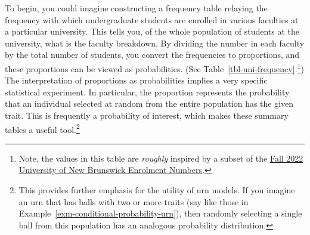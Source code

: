 \documentclass[
  letterpaper,
  DIV=11,
  numbers=noendperiod]{scrreprt}
\theoremstyle{definition}
\theoremstyle{definition}
\theoremstyle{definition}
\theoremstyle{remark}
\begin{document}
To begin, you could imagine constructing a frequency table relaying the
frequency with which undergraduate students are enrolled in various
faculties at a particular university. This tells you, of the whole
population of students at the university, what is the faculty breakdown.
By dividing the number in each faculty by the total number of students,
you convert the frequencies to proportions, and these proportions can be
viewed as probabilities. (See Table~\ref{tbl-uni-frequency}.\footnote{Note,
  the values in this table are \emph{roughly} inspired by a subset of
  the
  \href{https://web.archive.org/web/20240103124753/https://www.unb.ca/finance/_assets/documents/rpb/factbooktables/2022enrollment/20221215-tablee3-enrolment-ftehc-fac-acad-lvl-2022fa-final.pdf}{Fall
  2022 University of New Brunswick Enrolment Numbers}.}) The
interpretation of proportions as probabilities implies a very specific
statistical experiment. In particular, the proportion represents the
probability that an individual selected at random from the entire
population has the given trait. This is frequently a probability of
interest, which makes these summary tables a useful tool.\footnote{This
  provides further emphasis for the utility of urn models. If you
  imagine an urn that has balls with two or more traits (say like those
  in Example~\ref{exm-conditional-probability-urn}), then randomly
  selecting a single ball from this population has an analogous
  probability distribution.}

\begin{table}

\caption{\label{tbl-uni-frequency}Frequency and corresponding
proportions of enrolment by faculty in a university.}


\end{table}%
\end{document}
